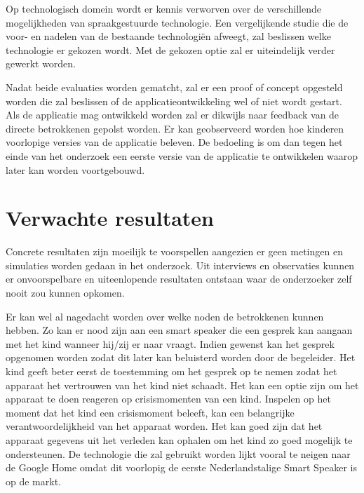 Op technologisch domein wordt er kennis verworven over de verschillende mogelijkheden van spraakgestuurde technologie. Een vergelijkende studie die de voor- en nadelen van de bestaande technologiën afweegt, zal beslissen welke technologie er gekozen wordt. Met de gekozen optie zal er uiteindelijk verder gewerkt worden.

Nadat beide evaluaties worden gematcht, zal er een proof of concept opgesteld worden die zal beslissen of de applicatieontwikkeling wel of niet wordt gestart. Als de applicatie mag ontwikkeld worden zal er dikwijls naar feedback van de directe betrokkenen gepolst worden. Er kan geobserveerd worden hoe kinderen voorlopige versies van de applicatie beleven. De bedoeling is om dan tegen het einde van het onderzoek een eerste versie van de applicatie te ontwikkelen waarop later kan worden voortgebouwd.

\section{Verwachte resultaten}
\label{sec:verwachte_resultaten}

Concrete resultaten zijn moeilijk te voorspellen aangezien er geen metingen en simulaties worden gedaan in het onderzoek. Uit interviews en observaties kunnen er onvoorspelbare en uiteenlopende resultaten ontstaan waar de onderzoeker zelf nooit zou kunnen opkomen.

Er kan wel al nagedacht worden over welke noden de betrokkenen kunnen hebben. Zo kan er nood zijn aan een smart speaker die een gesprek kan aangaan met het kind wanneer hij/zij er naar vraagt. Indien gewenst kan het gesprek opgenomen worden zodat dit later kan beluisterd worden door de begeleider. Het kind geeft beter eerst de toestemming om het gesprek op te nemen zodat het apparaat het vertrouwen van het kind niet schaadt.
Het kan een optie zijn om het apparaat te doen reageren op crisismomenten van een kind. Inspelen op het moment dat het kind een crisismoment beleeft, kan een belangrijke verantwoordelijkheid van het apparaat worden.
Het kan goed zijn dat het apparaat gegevens uit het verleden kan ophalen om het kind zo goed mogelijk te ondersteunen.
De technologie die zal gebruikt worden lijkt vooral te neigen naar de Google Home omdat dit voorlopig de eerste Nederlandstalige Smart Speaker is op de markt.

